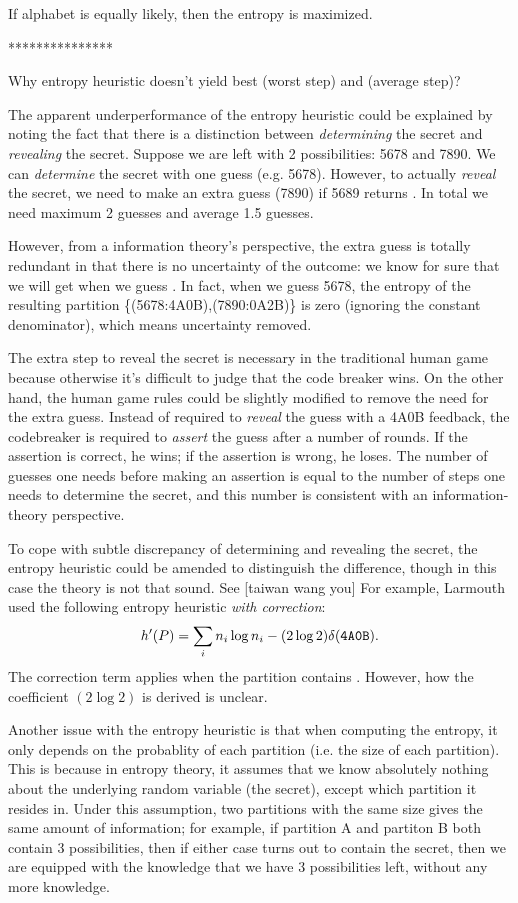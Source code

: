 If alphabet is equally likely, then the entropy is maximized.


***************

Why entropy heuristic doesn't yield best (worst step) and (average step)?

The apparent underperformance of the entropy heuristic could be explained by noting the fact that there is a distinction between \emph{determining} the secret and \emph{revealing} the secret. Suppose we are left with 2 possibilities: 5678 and 7890. We can \emph{determine} the secret with one guess (e.g. 5678). However, to actually \emph{reveal} the secret, we need to make an extra guess (7890) if 5689 returns . In total we need maximum 2 guesses and average 1.5 guesses.

However, from a information theory's perspective, the extra guess is totally redundant in that there is no uncertainty of the outcome: we know for sure that we will get  when we guess . In fact, when we guess 5678, the entropy of the resulting partition \{(5678:4A0B),(7890:0A2B)\} is zero (ignoring the constant denominator), which means uncertainty removed.

The extra step to reveal the secret is necessary in the traditional human game because otherwise it's difficult to judge that the code breaker wins. On the other hand, the human game rules could be slightly modified to remove the need for the extra guess. Instead of required to \emph{reveal} the guess with a 4A0B feedback, the codebreaker is required to \emph{assert} the guess after a number of rounds. If the assertion is correct, he wins; if the assertion is wrong, he loses. The number of guesses one needs before making an assertion is equal to the number of steps one needs to determine the secret, and this number is consistent with an information-theory perspective.

To cope with subtle discrepancy of determining and revealing the secret, the entropy heuristic could be amended to distinguish the difference, though in this case the theory is not that sound. See [taiwan wang you] For example, Larmouth \cite{aleph71} used the following entropy heuristic \emph{with correction}:
\[
h'(P) = \sum_i n_i \log n_i - (2 \log 2) \delta(\texttt{{4}A{0}B})  .
\]
The correction term applies when the partition contains . However, how the coefficient $(2 \log 2)$ is derived is unclear.

Another issue with the entropy heuristic is that when computing the entropy, it only depends on the probablity of each partition (i.e. the size of each partition). This is because in entropy theory, it assumes that we know absolutely nothing about the underlying random variable (the secret), except which partition it resides in. Under this assumption, two partitions with the same size gives the same amount of information; for example, if partition A and partiton B both contain 3 possibilities, then if either case turns out to contain the secret, then we are equipped with the knowledge that we have 3 possibilities left, without any more knowledge.

